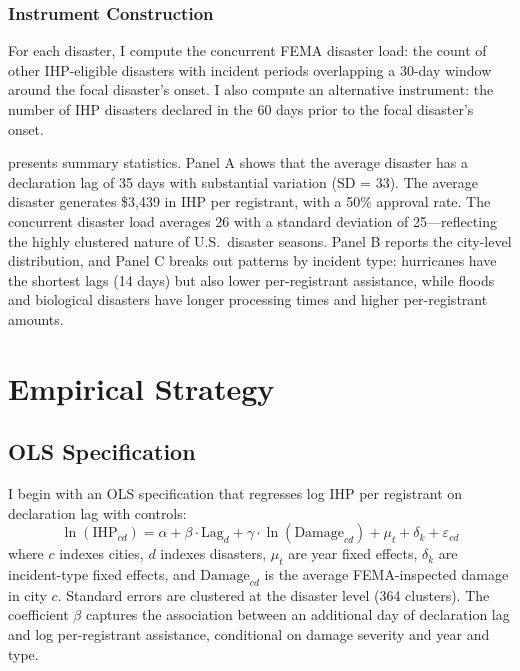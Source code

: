 \documentclass[12pt]{article}
\begin{document}
\subsubsection*{Instrument Construction} For each disaster, I compute the concurrent FEMA disaster load: the count of other IHP-eligible disasters with incident periods overlapping a 30-day window around the focal disaster's onset. I also compute an alternative instrument: the number of IHP disasters declared in the 60 days prior to the focal disaster's onset.

 presents summary statistics. Panel A shows that the average disaster has a declaration lag of 35 days with substantial variation (SD = 33). The average disaster generates \$3,439 in IHP per registrant, with a 50\% approval rate. The concurrent disaster load averages 26 with a standard deviation of 25---reflecting the highly clustered nature of U.S.\ disaster seasons. Panel B reports the city-level distribution, and Panel C breaks out patterns by incident type: hurricanes have the shortest lags (14 days) but also lower per-registrant assistance, while floods and biological disasters have longer processing times and higher per-registrant amounts.




\section{Empirical Strategy}

\subsection{OLS Specification}

I begin with an OLS specification that regresses log IHP per registrant on declaration lag with controls:
\begin{equation}
\ln(\text{IHP}_{cd}) = \alpha + \beta \cdot \text{Lag}_d + \gamma \cdot \ln(\text{Damage}_{cd}) + \mu_t + \delta_k + \varepsilon_{cd}
\label{eq:ols}
\end{equation}
where $c$ indexes cities, $d$ indexes disasters, $\mu_t$ are year fixed effects, $\delta_k$ are incident-type fixed effects, and $\text{Damage}_{cd}$ is the average FEMA-inspected damage in city $c$. Standard errors are clustered at the disaster level (364 clusters). The coefficient $\beta$ captures the association between an additional day of declaration lag and log per-registrant assistance, conditional on damage severity and year and type.
\end{document}
